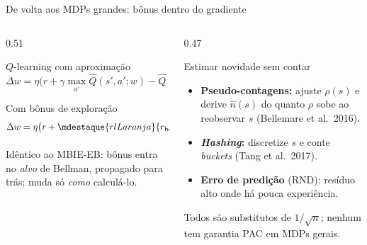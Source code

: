 \documentclass[aspectratio=169, 11pt]{beamer}
\begin{document}
\begin{frame}{De volta aos MDPs grandes: bônus dentro do gradiente}
  \begin{columns}[T]
    \begin{column}{0.51\textwidth}
      \begin{defbox}{$Q$-learning com aproximação}
        \[
          \Delta w = \eta \bigl( r + \gamma \max_{a'}\hat{Q}(s',a';w) - \hat{Q}(s,a;w)\bigr)
                     \nabla_w \hat{Q}
        \]
      \end{defbox}
      \begin{algbox}{Com bônus de exploração}
        \[
          \Delta w = \eta \bigl( r
          + \mdestaque{rlLaranja}{r_{\text{bônus}}(s,a)}
          + \gamma \max_{a'}\hat{Q}(s',a';w) - \hat{Q}(s,a;w)\bigr)
          \nabla_w \hat{Q}
        \]
      \end{algbox}
      {\small\color{rlCinza} Idêntico ao MBIE-EB: bônus entra no \emph{alvo} de
      Bellman, propagado para trás; muda só \emph{como} calculá-lo.}
    \end{column}
    \begin{column}{0.47\textwidth}
      \begin{teobox}{Estimar novidade sem contar}
        \begin{itemize}
          \item \textbf{Pseudo-contagens:} ajuste $\rho(s)$ e derive $\hat{n}(s)$ do
                quanto $\rho$ sobe ao reobservar $s$ (Bellemare et al.\ 2016).
          \item \textbf{\textit{Hashing}:} discretize $s$ e conte \textit{buckets}
                (Tang et al.\ 2017).
          \item \textbf{Erro de predição} (RND): resíduo alto onde há pouca experiência.
        \end{itemize}
      \end{teobox}
      \begin{alertabox}
        Todos são substitutos de $1/\sqrt{n}$; nenhum tem garantia PAC em MDPs gerais.
      \end{alertabox}
    \end{column}
  \end{columns}
\end{frame}
\end{document}
